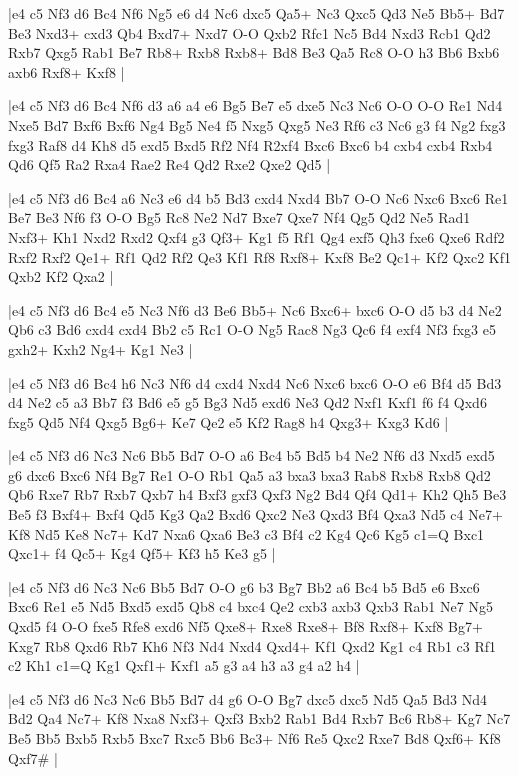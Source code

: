 \whitename{}
\blackname{}
\makegametitle
|e4 c5 Nf3 d6 Bc4 Nf6 Ng5 e6 d4 Nc6 dxc5 Qa5+ Nc3 Qxc5 Qd3 Ne5 Bb5+ Bd7 Be3 Nxd3+ cxd3 Qb4 Bxd7+ Nxd7 O-O Qxb2 Rfc1 Nc5 Bd4 Nxd3 Rcb1 Qd2 Rxb7 Qxg5 Rab1 Be7 Rb8+ Rxb8 Rxb8+ Bd8 Be3 Qa5 Rc8 O-O h3 Bb6 Bxb6 axb6 Rxf8+ Kxf8  |

\whitename{}
\blackname{}
\makegametitle
|e4 c5 Nf3 d6 Bc4 Nf6 d3 a6 a4 e6 Bg5 Be7 e5 dxe5 Nc3 Nc6 O-O O-O Re1 Nd4 Nxe5 Bd7 Bxf6 Bxf6 Ng4 Bg5 Ne4 f5 Nxg5 Qxg5 Ne3 Rf6 c3 Nc6 g3 f4 Ng2 fxg3 fxg3 Raf8 d4 Kh8 d5 exd5 Bxd5 Rf2 Nf4 R2xf4 Bxc6 Bxc6 b4 cxb4 cxb4 Rxb4 Qd6 Qf5 Ra2 Rxa4 Rae2 Re4 Qd2 Rxe2 Qxe2 Qd5  |

\whitename{}
\blackname{}
\makegametitle
|e4 c5 Nf3 d6 Bc4 a6 Nc3 e6 d4 b5 Bd3 cxd4 Nxd4 Bb7 O-O Nc6 Nxc6 Bxc6 Re1 Be7 Be3 Nf6 f3 O-O Bg5 Rc8 Ne2 Nd7 Bxe7 Qxe7 Nf4 Qg5 Qd2 Ne5 Rad1 Nxf3+ Kh1 Nxd2 Rxd2 Qxf4 g3 Qf3+ Kg1 f5 Rf1 Qg4 exf5 Qh3 fxe6 Qxe6 Rdf2 Rxf2 Rxf2 Qe1+ Rf1 Qd2 Rf2 Qe3 Kf1 Rf8 Rxf8+ Kxf8 Be2 Qc1+ Kf2 Qxc2 Kf1 Qxb2 Kf2 Qxa2  |

\whitename{}
\blackname{}
\makegametitle
|e4 c5 Nf3 d6 Bc4 e5 Nc3 Nf6 d3 Be6 Bb5+ Nc6 Bxc6+ bxc6 O-O d5 b3 d4 Ne2 Qb6 c3 Bd6 cxd4 cxd4 Bb2 c5 Rc1 O-O Ng5 Rac8 Ng3 Qc6 f4 exf4 Nf3 fxg3 e5 gxh2+ Kxh2 Ng4+ Kg1 Ne3  |

\whitename{}
\blackname{}
\makegametitle
|e4 c5 Nf3 d6 Bc4 h6 Nc3 Nf6 d4 cxd4 Nxd4 Nc6 Nxc6 bxc6 O-O e6 Bf4 d5 Bd3 d4 Ne2 c5 a3 Bb7 f3 Bd6 e5 g5 Bg3 Nd5 exd6 Ne3 Qd2 Nxf1 Kxf1 f6 f4 Qxd6 fxg5 Qd5 Nf4 Qxg5 Bg6+ Ke7 Qe2 e5 Kf2 Rag8 h4 Qxg3+ Kxg3 Kd6  |

\whitename{}
\blackname{}
\makegametitle
|e4 c5 Nf3 d6 Nc3 Nc6 Bb5 Bd7 O-O a6 Bc4 b5 Bd5 b4 Ne2 Nf6 d3 Nxd5 exd5 g6 dxc6 Bxc6 Nf4 Bg7 Re1 O-O Rb1 Qa5 a3 bxa3 bxa3 Rab8 Rxb8 Rxb8 Qd2 Qb6 Rxe7 Rb7 Rxb7 Qxb7 h4 Bxf3 gxf3 Qxf3 Ng2 Bd4 Qf4 Qd1+ Kh2 Qh5 Be3 Be5 f3 Bxf4+ Bxf4 Qd5 Kg3 Qa2 Bxd6 Qxc2 Ne3 Qxd3 Bf4 Qxa3 Nd5 c4 Ne7+ Kf8 Nd5 Ke8 Nc7+ Kd7 Nxa6 Qxa6 Be3 c3 Bf4 c2 Kg4 Qc6 Kg5 c1=Q Bxc1 Qxc1+ f4 Qc5+ Kg4 Qf5+ Kf3 h5 Ke3 g5  |

\whitename{}
\blackname{}
\makegametitle
|e4 c5 Nf3 d6 Nc3 Nc6 Bb5 Bd7 O-O g6 b3 Bg7 Bb2 a6 Bc4 b5 Bd5 e6 Bxc6 Bxc6 Re1 e5 Nd5 Bxd5 exd5 Qb8 c4 bxc4 Qe2 cxb3 axb3 Qxb3 Rab1 Ne7 Ng5 Qxd5 f4 O-O fxe5 Rfe8 exd6 Nf5 Qxe8+ Rxe8 Rxe8+ Bf8 Rxf8+ Kxf8 Bg7+ Kxg7 Rb8 Qxd6 Rb7 Kh6 Nf3 Nd4 Nxd4 Qxd4+ Kf1 Qxd2 Kg1 c4 Rb1 c3 Rf1 c2 Kh1 c1=Q Kg1 Qxf1+ Kxf1 a5 g3 a4 h3 a3 g4 a2 h4  |

\whitename{}
\blackname{}
\makegametitle
|e4 c5 Nf3 d6 Nc3 Nc6 Bb5 Bd7 d4 g6 O-O Bg7 dxc5 dxc5 Nd5 Qa5 Bd3 Nd4 Bd2 Qa4 Nc7+ Kf8 Nxa8 Nxf3+ Qxf3 Bxb2 Rab1 Bd4 Rxb7 Bc6 Rb8+ Kg7 Nc7 Be5 Bb5 Bxb5 Rxb5 Bxc7 Rxc5 Bb6 Bc3+ Nf6 Re5 Qxc2 Rxe7 Bd8 Qxf6+ Kf8 Qxf7\#  |

